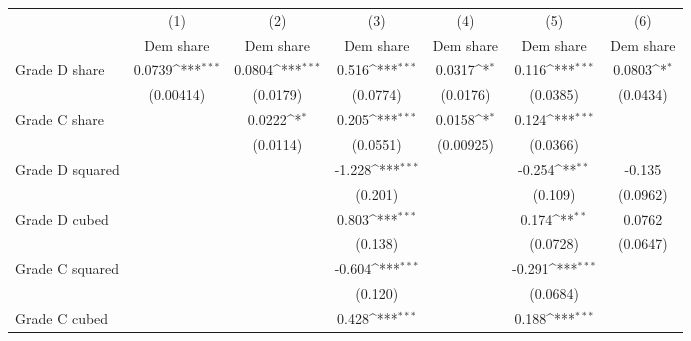 {
\def\sym#1{\ifmmode^{#1}\else\(^{#1}\)\fi}
\begin{tabular}{l*{6}{c}}
\toprule
                    &\multicolumn{1}{c}{(1)}&\multicolumn{1}{c}{(2)}&\multicolumn{1}{c}{(3)}&\multicolumn{1}{c}{(4)}&\multicolumn{1}{c}{(5)}&\multicolumn{1}{c}{(6)}\\
                    &\multicolumn{1}{c}{Dem share}&\multicolumn{1}{c}{Dem share}&\multicolumn{1}{c}{Dem share}&\multicolumn{1}{c}{Dem share}&\multicolumn{1}{c}{Dem share}&\multicolumn{1}{c}{Dem share}\\
\midrule
Grade D share       &      0.0739\sym{***}&      0.0804\sym{***}&       0.516\sym{***}&      0.0317\sym{*}  &       0.116\sym{***}&      0.0803\sym{*}  \\
                    &   (0.00414)         &    (0.0179)         &    (0.0774)         &    (0.0176)         &    (0.0385)         &    (0.0434)         \\
\addlinespace
Grade C share       &                     &      0.0222\sym{*}  &       0.205\sym{***}&      0.0158\sym{*}  &       0.124\sym{***}&                     \\
                    &                     &    (0.0114)         &    (0.0551)         &   (0.00925)         &    (0.0366)         &                     \\
\addlinespace
Grade D squared     &                     &                     &      -1.228\sym{***}&                     &      -0.254\sym{**} &      -0.135         \\
                    &                     &                     &     (0.201)         &                     &     (0.109)         &    (0.0962)         \\
\addlinespace
Grade D cubed       &                     &                     &       0.803\sym{***}&                     &       0.174\sym{**} &      0.0762         \\
                    &                     &                     &     (0.138)         &                     &    (0.0728)         &    (0.0647)         \\
\addlinespace
Grade C squared     &                     &                     &      -0.604\sym{***}&                     &      -0.291\sym{***}&                     \\
                    &                     &                     &     (0.120)         &                     &    (0.0684)         &                     \\
\addlinespace
Grade C cubed       &                     &                     &       0.428\sym{***}&                     &       0.188\sym{***}&                     \\

\end{tabular}}

